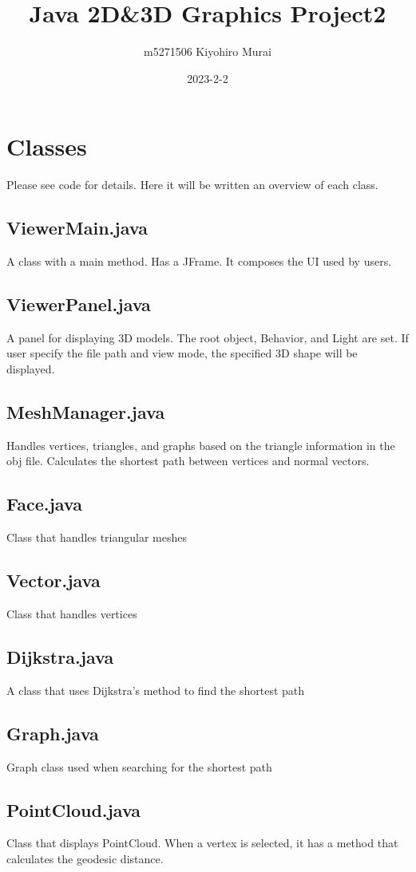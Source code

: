 \documentclass[12pt]{article}
\title{Java 2D\&3D Graphics Project2}
\author{m5271506 Kiyohiro Murai}
\date{2023-2-2}
\begin{document}
\maketitle
\tableofcontents
\newpage

\section{Classes}
Please see code for details. Here it will be written an overview of each class.
\subsection{ViewerMain.java}
A class with a main method. Has a JFrame. It composes the UI used by users.
\subsection{ViewerPanel.java}
A panel for displaying 3D models. The root object, Behavior, and Light are set.
If user specify the file path and view mode, the specified 3D shape will be
displayed.

\subsection{MeshManager.java}
Handles vertices, triangles, and graphs based on the triangle information in
the obj file. Calculates the shortest path between vertices and normal vectors.

\subsection{Face.java}
Class that handles triangular meshes
\subsection{Vector.java}
Class that handles vertices
\subsection{Dijkstra.java}
A class that uses Dijkstra's method to find the shortest path
\subsection{Graph.java}
Graph class used when searching for the shortest path
\subsection{PointCloud.java}
Class that displays PointCloud. When a vertex is selected, it has a method that
calculates the geodesic distance.
\end{document}
